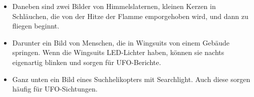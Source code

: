 \documentclass{scrartcl}
\begin{document}
\begin{itemize}
    \item Daneben sind zwei Bilder von Himmelslaternen, kleinen Kerzen in \frq Schläuchen\flq, die von der Hitze der Flamme emporgehoben wird, und dann zu fliegen beginnt.
    \item Darunter ein Bild von Menschen, die in Wingsuits von einem Gebäude springen. Wenn die Wingsuits LED-Lichter haben, können sie nachts eigenartig blinken und sorgen für UFO-Berichte.
    \item Ganz unten ein Bild eines Suchhelikopters mit Searchlight. Auch diese sorgen häufig für UFO-Sichtungen.
\end{itemize}
\end{document}
